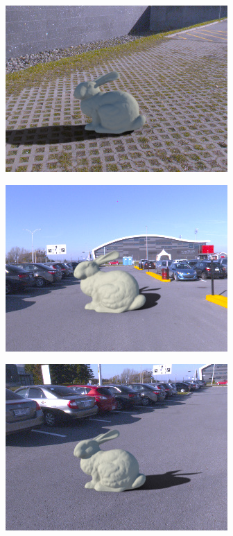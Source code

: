 \begin{minipage}{\linewidth}
\begin{multicols}{4}
\includegraphics[width=\mywidth]{AG8A2917_Panorama_hdr-corrected_014.jpg}

\includegraphics[width=\mywidth]{AG8A2959_Panorama_hdr-corrected_002.jpg}

\includegraphics[width=\mywidth]{AG8A2959_Panorama_hdr-corrected_003.jpg}






\end{multicols}
\end{minipage}
